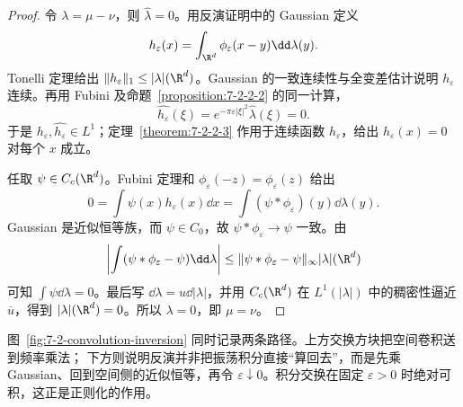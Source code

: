 \begin{proof}
令 $\lambda=\mu-\nu$，则 $\widehat\lambda=0$。用反演证明中的 Gaussian 定义
\[
 h_\varepsilon(x)=\int_{\R^d}\phi_\varepsilon(x-y)\dd\lambda(y).
\]
Tonelli 定理给出
$\|h_\varepsilon\|_1\leq|\lambda|(\R^d)$。Gaussian 的一致连续性与全变差估计说明
$h_\varepsilon$ 连续。再用 Fubini 及命题~\ref{proposition:7-2-2-2} 的同一计算，
\[
 \widehat{h_\varepsilon}(\xi)
 =e^{-\pi\varepsilon|\xi|^2}\widehat\lambda(\xi)=0.
\]
于是 $h_\varepsilon,\widehat{h_\varepsilon}\in L^1$；定理~\ref{theorem:7-2-2-3} 作用于连续函数
$h_\varepsilon$，给出 $h_\varepsilon(x)=0$ 对每个 $x$ 成立。

任取 $\psi\in C_c(\R^d)$。Fubini 定理和 $\phi_\varepsilon(-z)=\phi_\varepsilon(z)$ 给出
\[
 0=\int\psi(x)h_\varepsilon(x)\dd x
 =\int(\psi*\phi_\varepsilon)(y)\dd\lambda(y).
\]
Gaussian 是近似恒等族，而 $\psi\in C_0$，故
$\psi*\phi_\varepsilon\to\psi$ 一致。由
\[
 \left|\int(\psi*\phi_\varepsilon-\psi)\dd\lambda\right|
 \leq\|\psi*\phi_\varepsilon-\psi\|_\infty|\lambda|(\R^d)
\]
可知 $\int\psi\dd\lambda=0$。最后写
$\dd\lambda=u\dd|\lambda|$，并用 $C_c(\R^d)$ 在
$L^1(|\lambda|)$ 中的稠密性逼近 $\overline u$，得到
$|\lambda|(\R^d)=0$。所以 $\lambda=0$，即 $\mu=\nu$。
\end{proof}

图~\ref{fig:7-2-convolution-inversion} 同时记录两条路径。上方交换方块把空间卷积送到频率乘法；
下方则说明反演并非把振荡积分直接“算回去”，而是先乘 Gaussian、回到空间侧的近似恒等，再令
$\varepsilon\downarrow0$。积分交换在固定 $\varepsilon>0$ 时绝对可积，这正是正则化的作用。


